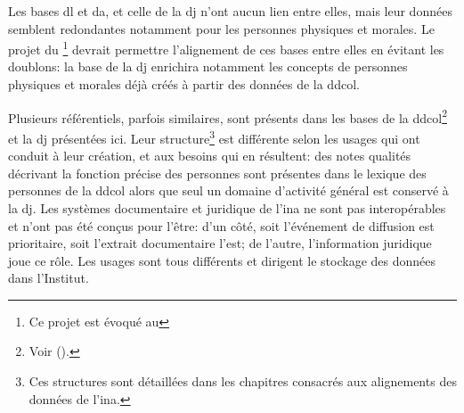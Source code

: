 Les bases \ac{dl} et \ac{da}, et celle de la \ac{dj} n'ont aucun lien entre elles, mais leur données semblent redondantes notamment pour les personnes physiques et morales. Le projet du \ldd\footnote{Ce projet est évoqué au } devrait permettre l'alignement de ces bases entre elles en évitant les doublons: la base de la \ac{dj} enrichira notamment les concepts de personnes physiques et morales déjà créés à partir des données de la \ac{ddcol}.

\bigskip
\bigskip

Plusieurs référentiels, parfois similaires, sont présents dans les bases de la \ac{ddcol}\footnote{Voir  ().} et la \ac{dj} présentées ici. Leur structure\footnote{Ces structures sont détaillées dans les chapitres consacrés aux alignements des données de l'\ac{ina}.} est différente selon les usages qui ont conduit à leur création, et aux besoins qui en résultent: des notes qualités décrivant la fonction précise des personnes sont présentes dans le lexique des personnes de la \ac{ddcol} alors que seul un domaine d'activité général est conservé à la \ac{dj}. Les systèmes documentaire et juridique de l'\ac{ina} ne sont pas interopérables et n'ont pas été conçus pour l'être: d'un côté, soit l'événement de diffusion est prioritaire, soit l'extrait documentaire l'est; de l'autre, l'information juridique joue ce rôle. Les usages sont tous différents et dirigent le stockage des données dans l'Institut.